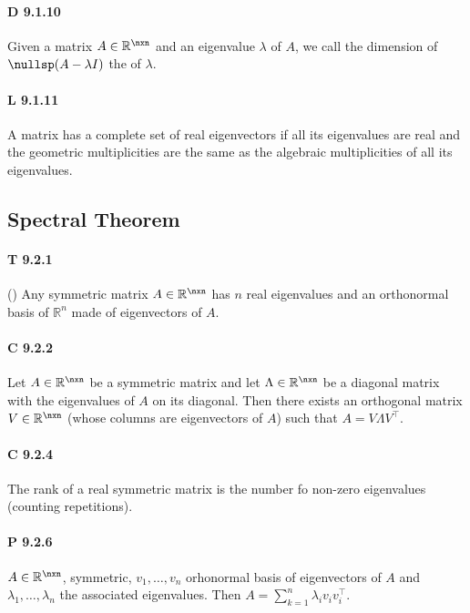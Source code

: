 \paragraph{D 9.1.10} Given a matrix $A\in\mathbb{R}^{\nxn}$ and
an eigenvalue $\lambda$ of $A$, we call the dimension of $\nullsp(A-\lambda I)$
the  of $\lambda$.

\paragraph{L 9.1.11} A matrix has a complete set of real eigenvectors if all its 
eigenvalues are real and the geometric multiplicities are the same as the
algebraic multiplicities of all its eigenvalues.

\subsection{Spectral Theorem}

\paragraph{T 9.2.1} () Any symmetric matrix
$A\in\mathbb{R}^{\nxn}$ has $n$ real eigenvalues and an orthonormal basis of $\mathbb{R}^n$ made of eigenvectors of $A$.

\paragraph{C 9.2.2} Let $A\in\mathbb{R}^{\nxn}$ be a symmetric matrix and let $\Lambda\in\mathbb{R}^{\nxn}$ be a diagonal matrix with the eigenvalues of $A$ on its diagonal. Then there exists an orthogonal matrix $V\in\mathbb{R}^{\nxn}$ (whose columns are eigenvectors of $A$) such that $A=V\Lambda V^\top$.

\paragraph{C 9.2.4} The rank of a real symmetric matrix is the
number fo non-zero eigenvalues (counting repetitions).

\paragraph{P 9.2.6} $A \in \mathbb{R}^{\nxn}$, symmetric,
$v_1, \dots, v_n$ orhonormal basis of eigenvectors of $A$ and
$\lambda_1, \dots, \lambda_n$ the associated eigenvalues. Then
$A = \sum_{k=1}^{n}\lambda_i v_i v_i^\top$.

